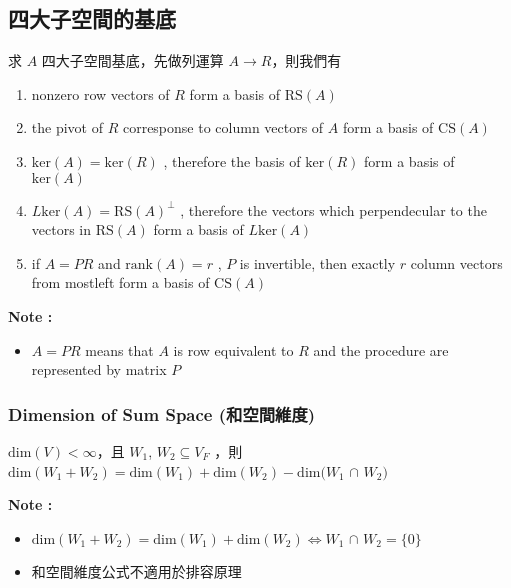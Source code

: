 \documentclass[
]{book}
\providecommand{\tightlist}{%
  \setlength{\itemsep}{0pt}\setlength{\parskip}{0pt}}
\begin{document}
\hypertarget{ux56dbux5927ux5b50ux7a7aux9593ux7684ux57faux5e95}{%
\subsection{四大子空間的基底}\label{ux56dbux5927ux5b50ux7a7aux9593ux7684ux57faux5e95}}

求 \(A\) 四大子空間基底，先做列運算 \(A \rightarrow R\)，則我們有

\begin{enumerate}
\def\labelenumi{\arabic{enumi}.}
\tightlist
\item
  nonzero row vectors of \(R\) form a basis of \(\mbox{RS}(A)\)
\item
  the pivot of \(R\) corresponse to column vectors of \(A\) form a basis of \(\mbox{CS}(A)\)
\item
  \(\mbox{ker}(A) = \mbox{ker}(R)\) , therefore the basis of \(\mbox{ker}(R)\) form a basis of \(\mbox{ker}(A)\)
\item
  \(L\mbox{ker}(A) = \mbox{RS}(A)^{\bot}\) , therefore the vectors which perpendecular to the vectors in \(\mbox{RS}(A)\) form a basis of \(L\mbox{ker}(A)\)
\item
  if \(A = PR\) and \(\mbox{rank}(A) = r\) , \(P\) is invertible, then exactly \(r\) column vectors from mostleft form a basis of \(\mbox{CS}(A)\)
\end{enumerate}

\textbf{Note :}

\begin{itemize}
\tightlist
\item
  \(A = PR\) means that \(A\) is row equivalent to \(R\) and the procedure are represented by matrix \(P\)
\end{itemize}

\hypertarget{dimension-of-sum-space-ux548cux7a7aux9593ux7dadux5ea6}{%
\subsubsection{Dimension of Sum Space (和空間維度)}\label{dimension-of-sum-space-ux548cux7a7aux9593ux7dadux5ea6}}

\(\mbox{dim}(V) < \infty\)，且 \(W_1\), \(W_2\subseteq V_F\) ，則 \(\mbox{dim}(W_1 + W_2) = \mbox{dim}(W_1) + \mbox{dim}(W_2) - \mbox{dim}(W_1\) \(\cap\) \(W_2)\)

\textbf{Note :}

\begin{itemize}
\tightlist
\item
  \(\mbox{dim}(W_1 + W_2) = \mbox{dim}(W_1) + \mbox{dim}(W_2) \iff W_1\) \(\cap\) \(W_2 = \{0\}\)
\item
  和空間維度公式不適用於排容原理
\end{itemize}
\end{document}
